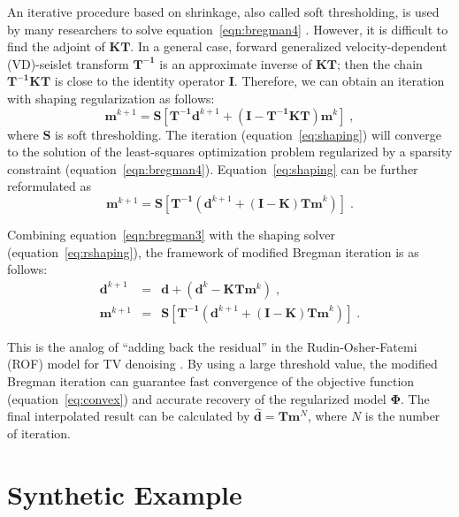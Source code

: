 An iterative procedure based on shrinkage, also called soft
thresholding, is used by many researchers to solve
equation~\ref{eqn:bregman4} \cite[]{Daubechies04}. However, it is
difficult to find the adjoint of $\mathbf{KT}$. In a general case,
forward generalized velocity-dependent (VD)-seislet transform
$\mathbf{T^{-1}}$ is an approximate inverse of $\mathbf{KT}$; then the
chain $\mathbf{T^{-1}KT}$ is close to the identity operator
$\mathbf{I}$. Therefore, we can obtain an iteration with shaping
regularization \cite[]{Fomel08} as follows:
\begin{equation}
  \label{eq:shaping}
   \mathbf{m}^{k+1} = \mathbf{S}[\mathbf{T^{-1}}\mathbf{d}^{k+1}+
    (\mathbf{I}-\mathbf{T^{-1}KT})\mathbf{m}^k]\;,
\end{equation}
where $\mathbf{S}$ is soft thresholding. The iteration
(equation~\ref{eq:shaping}) will converge to the solution of the
least-squares optimization problem regularized by a sparsity
constraint (equation~\ref{eqn:bregman4}). Equation~\ref{eq:shaping}
can be further reformulated as
\begin{equation}
  \label{eq:rshaping}
   \mathbf{m}^{k+1} = \mathbf{S}[\mathbf{T^{-1}}(\mathbf{d}^{k+1}+
    (\mathbf{I}-\mathbf{K})\mathbf{Tm}^k)]\;.
\end{equation}

Combining equation~\ref{eqn:bregman3} with the shaping solver
(equation~\ref{eq:rshaping}), the framework of modified Bregman
iteration is as follows:
\begin{eqnarray}
  \label{eqn:bregman5} 
  \mathbf{d}^{k+1}&=&\mathbf{d}+(\mathbf{d}^k-\mathbf{KT}\mathbf{m}^{k})\;,\\
  \label{eqn:bregman6}
  \mathbf{m}^{k+1}&=&\mathbf{S}[\mathbf{T^{-1}}(\mathbf{d}^{k+1}+
    (\mathbf{I}-\mathbf{K})\mathbf{Tm}^k)]\;.
\end{eqnarray}

This is the analog of ``adding back the residual'' in the
Rudin-Osher-Fatemi (ROF) model for TV denoising \cite[]{Osher05}. By
using a large threshold value, the modified Bregman iteration can
guarantee fast convergence of the objective function
(equation~\ref{eq:convex}) and accurate recovery of the regularized
model $\mathbf{\Phi}$. The final interpolated result can be calculated
by $\hat{\mathbf{d}}=\mathbf{T}\mathbf{m}^{N}$, where $N$ is
the number of iteration.

 \section{Synthetic Example}

